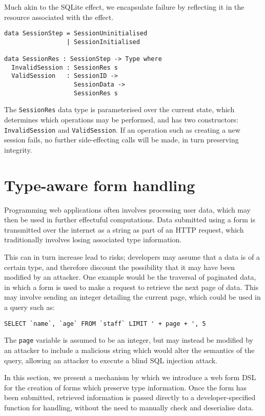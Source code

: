 \documentclass[preprint]{sigplanconf}
\begin{document}
Much akin to the SQLite effect, we encapsulate failure by reflecting it in the resource associated with the effect. 

\begin{verbatim}
data SessionStep = SessionUninitialised
                 | SessionInitialised

data SessionRes : SessionStep -> Type where
  InvalidSession : SessionRes s  
  ValidSession   : SessionID -> 
                   SessionData -> 
                   SessionRes s
\end{verbatim}
The \texttt{SessionRes} data type is parameterised over the current state, which determines which operations may be performed, and has two constructors: \texttt{InvalidSession} and \texttt{ValidSession}. If an operation such as creating a new session fails, no further side-effecting calls will be made, in turn preserving integrity. 


\section{Type-aware form handling}
Programming web applications often involves processing user data, which may then be used in further effectuful computations. Data submitted using a form is transmitted over the internet as a string as part of an HTTP request, which traditionally involves losing associated type information. 

This can in turn increase lead to risks; developers may assume that a data is of a certain type, and therefore discount the possibility that it may have been modified by an attacker. One example would be the traversal of paginated data, in which a form is used to make a request to retrieve the next page of data. This may involve sending an integer detailing the current page, which could be used in a query such as:

\begin{verbatim}
SELECT `name`, `age` FROM `staff` LIMIT ' + page + ', 5
\end{verbatim}
The \texttt{page} variable is assumed to be an integer, but may instead be modified by an attacker to include a malicious string which would alter the semantics of the query, allowing an attacker to execute a blind SQL injection attack. %

In this section, we present a mechanism by which we introduce a web form DSL for the creation of forms which preserve type information. Once the form has been submitted, retrieved information is passed directly to a developer-specified function for handling, without the need to manually check and deserialise data. 
\end{document}
